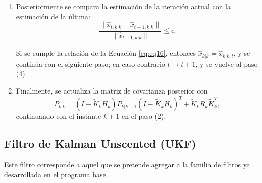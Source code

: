 \begin{enumerate}
\item Posteriormente se compara la estimaci\'on de la iteraci\'on actual con la estimaci\'on de la \'ultima:
\begin{equation}
\dfrac{\parallel  \hat{x}_{t, k|k} - \hat{x}_{t-1, k|k} \parallel }{\parallel \hat{x}_{t-1, k|k} \parallel} \leq \epsilon.
\label{eq:eq16}
\end{equation}

Si se cumple la relaci\'on de la Ecuaci\'on \ref{eq:eq16}, entonces $\hat{x}_{k|k} = \hat{x}_{k|k,t}$, y se contin\'ua con el siguiente paso; en caso contrario $t\rightarrow t+1$, y se vuelve al paso (4).

\item Finalmente, se actualiza la matriz de covarianza posterior con 
\begin{equation}
P_{k|k} = \left(I - \tilde{K}_kH_k \right)P_{k|k-1} \left(I - \tilde{K}_k H_k \right)^T + \tilde{K}_kR_k\tilde{K}^T_k,
\label{eq:eq17}
\end{equation}
continuando con el instante $k+1$ en el paso (2).
\end{enumerate}


\subsection{Filtro de Kalman Unscented (UKF)}
\label{ssec:ukf}
Este filtro corresponde a aquel que se pretende agregar a la familia de filtros ya desarrollada en el programa base.
\bigskip


